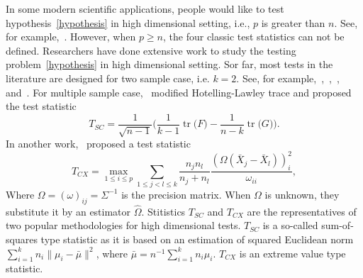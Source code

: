 \documentclass[review]{elsarticle}
\DeclareMathOperator{\mytr}{tr}
\newcommand{\bX}{\mathbf{X}}
\theoremstyle{plain}
\theoremstyle{definition}
\theoremstyle{remark}
\begin{document}


In some modern scientific applications, people would like to test hypothesis~\eqref{hypothesis} in high dimensional setting, i.e., $p$ is greater than $n$. See, for example,~\cite{Tsai2009}.
However, when $p\geq n$, the four classic test statistics can not be defined.
  Researchers have done extensive work to study the testing problem~\eqref{hypothesis} in high dimensional setting.
 Sor far, most tests in the literature are designed for two sample case, i.e. $k=2$.
  See, for example,~\cite{Bai1996Efiect},~\cite{Chen2010A},~\cite{Srivastava2009A},~\cite{Feng2015Multivariate} and~\cite{Tony2013}.
  For multiple sample case,~\cite{Schott2007Some} modified Hotelling-Lawley trace and proposed the test statistic
  $$
  T_{SC}=\frac{1}{\sqrt{n-1}}\Big(
  \frac{1}{k-1}\mytr\big(F\big)-\frac{1}{n-k}\mytr\big(G\big)
  \Big).
  $$
In another work,~\cite{Cai2014High} proposed a test statistic
  $$
  T_{CX}=\max_{1\leq i\leq p} \sum_{1\leq j<l\leq k}\frac{n_j n_l}{n_j+n_l}\frac{(\Omega(\bar{X}_j-\bar{X}_l))_i^2}{\omega_{ii}},
  $$
  Where $\Omega=(\omega)_{ij}=\Sigma^{-1}$ is the precision matrix. When $\Omega$ is unknown, they substitute it by an estimator $\hat{\Omega}$.
  Stitistics $T_{SC}$ and $T_{CX}$ are the representatives of two popular methodologies for high dimensional tests.
  $T_{SC}$ is a so-called sum-of-squares type statistic as it is based on an estimation of squared Euclidean norm $\sum_{i=1}^k n_i\|\mu_i-\bar{\mu}\|^2$, where $\bar{\mu}=n^{-1}\sum_{i=1}^k n_i \mu_i$.
  $T_{CX}$ is an extreme value type statistic.
  
\end{document}
